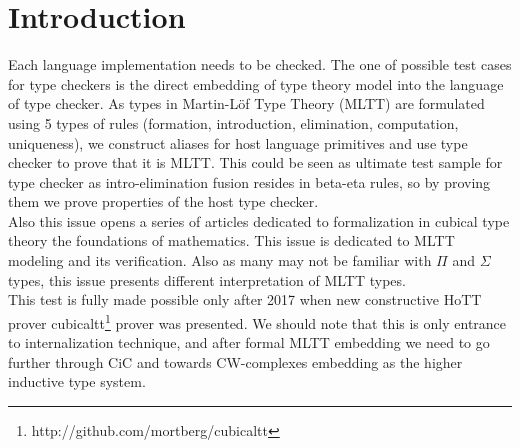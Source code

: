 \documentclass{article}
\theoremstyle{definition}
\begin{document}
\begin{abstract}
{\bf Conclusion.} We should note that this is an entrance to the internalization
technique, and after formal MLTT embedding, we could go through
inductive types up to embedding of CW-complexes as the indexed
gluing of the higher inductive types. This means the implementation
of a wide spectrum of math theories inside HoTT up to algebraic topology.
The further reflection on type theories unveils the combinations in a
    spirit of do-it-yourself (DIY) type theories with unified higher-order
abstract syntax (HOAS) for pluggable initial objects, normalization modules, and equation checkers.\\
{\bf Keywords}: Martin-Löf Type Theory, Cubical Type Theory
\vspace{1cm}

\end{abstract}

\tableofcontents

\section*{Introduction}

\fontsize{10}{12}\selectfont

Each language implementation needs to be checked. The one of possible test cases
for type checkers is the direct embedding of type theory model into the language of type checker.
As types in Martin-Löf Type Theory\cite{Lof72,Lof84} (MLTT) are formulated using 5 types of rules (formation,
introduction, elimination, computation, uniqueness), we construct aliases
for host language primitives and use type checker to prove that it is MLTT.
This could be seen as ultimate test sample for type checker as
intro-elimination fusion resides in beta-eta rules, so by proving them
we prove properties of the host type checker.\\
Also this issue opens a series of articles dedicated to formalization in
cubical type theory the foundations of mathematics. This issue is dedicated
to MLTT modeling and its verification. Also as many may not be familiar with
$\Pi$ and $\Sigma$ types, this issue presents different interpretation of MLTT types.\\
This test is fully made possible only after 2017 when new constructive HoTT\cite{HoTT13} prover cubicaltt\footnote{http://github.com/mortberg/cubicaltt}
prover was presented\cite{Mortberg17}. We should note that this is only entrance
to internalization technique, and after formal MLTT embedding we
need to go further through CiC\cite{Pfenning89,Dybjer94} and towards CW-complexes
embedding as the higher inductive type system.
\end{document}
